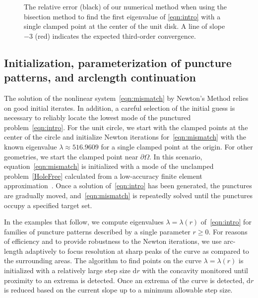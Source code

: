 \documentclass[times]{article}
\newcommand{\bd}{\partial}
\begin{document}
\begin{figure}[htbp]
\centering

\parbox{0.75\textwidth}{\caption{The relative error (black) of our
numerical method when using the bisection method to find the first
eigenvalue of \eqref{eqn:intro} with a single clamped point at the
center of the unit disk.  A line of slope $-3$ (red) indicates the
expected third-order convergence.\label{fig:ErrorDisk}}}
\end{figure}

\subsection{Initialization, parameterization of puncture patterns, and
arclength continuation}
\label{sec:initial_guess}

The solution of the nonlinear system~\eqref{eqn:mismatch} by Newton's
Method relies on good initial iterates. In addition, a careful selection
of the initial guess is necessary to reliably locate the lowest mode of
the punctured problem~\eqref{eqn:intro}. For the unit circle, we start
with the clamped points at the center of the circle and initialize
Newton iterations for~\eqref{eqn:mismatch} with the known eigenvalue
$\lambda \approx 516.9609$ for a single clamped point at the origin.
For other geometries, we start the clamped point near $\bd\Omega$.  In
this scenario, equation~\eqref{eqn:mismatch} is initialized with a mode
of the unclamped problem~\eqref{HoleFree} calculated from a low-accuracy
finite element approximation~\cite{KI78}.  Once a solution
of~\eqref{eqn:intro} has been generated, the punctures are gradually
moved, and~\eqref{eqn:mismatch} is repeatedly solved until the punctures
occupy a specified target set.

In the examples that follow, we compute eigenvalues $\lambda =
\lambda(r)$ of~\eqref{eqn:intro} for families of puncture patterns
described by a single parameter $r\geq0$. For reasons of efficiency
and to provide robustness to the Newton iterations, we use arc-length
adaptively to focus resolution at  sharp peaks of the curve as compared
to the surrounding areas. The algorithm to find points on the curve
$\lambda = \lambda(r)$ is initialized with a relatively large step size
$\mathrm{d}r$ with the concavity monitored until proximity to an extrema
is detected. Once an extrema of the curve is detected, $\mathrm{d}r$ is
reduced based on the current slope up to a minimum allowable step size. 
\end{document}
